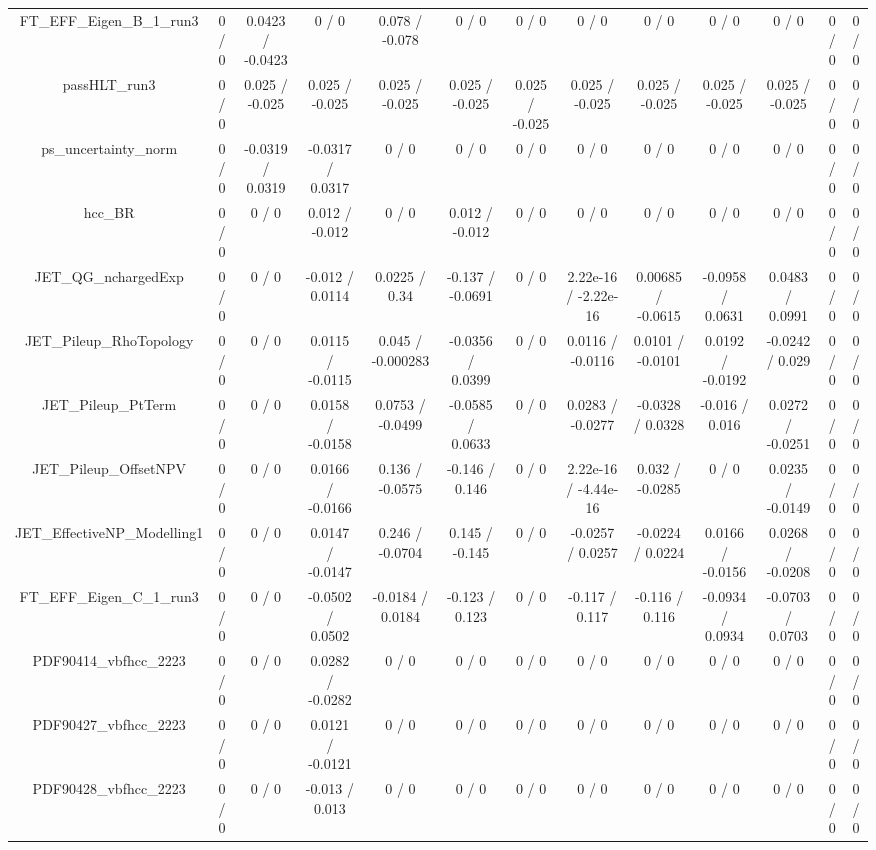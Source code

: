 \documentclass[10pt]{article}
\begin{document}
\begin{table}[htbp]
\begin{center}
\begin{tabular}{|c|c|c|c|c|c|c|c|c|c|c|c|c|}
  FT_EFF_Eigen_B_1_run3 & 0 / 0 & 0.0423 / -0.0423 & 0 / 0 & 0.078 / -0.078 & 0 / 0 & 0 / 0 & 0 / 0 & 0 / 0 & 0 / 0 & 0 / 0 & 0 / 0 & 0 / 0 \\ 
  passHLT_run3 & 0 / 0 & 0.025 / -0.025 & 0.025 / -0.025 & 0.025 / -0.025 & 0.025 / -0.025 & 0.025 / -0.025 & 0.025 / -0.025 & 0.025 / -0.025 & 0.025 / -0.025 & 0.025 / -0.025 & 0 / 0 & 0 / 0 \\ 
  ps_uncertainty_norm & 0 / 0 & -0.0319 / 0.0319 & -0.0317 / 0.0317 & 0 / 0 & 0 / 0 & 0 / 0 & 0 / 0 & 0 / 0 & 0 / 0 & 0 / 0 & 0 / 0 & 0 / 0 \\ 
  hcc_BR & 0 / 0 & 0 / 0 & 0.012 / -0.012 & 0 / 0 & 0.012 / -0.012 & 0 / 0 & 0 / 0 & 0 / 0 & 0 / 0 & 0 / 0 & 0 / 0 & 0 / 0 \\ 
  JET_QG_nchargedExp & 0 / 0 & 0 / 0 & -0.012 / 0.0114 & 0.0225 / 0.34 & -0.137 / -0.0691 & 0 / 0 & 2.22e-16 / -2.22e-16 & 0.00685 / -0.0615 & -0.0958 / 0.0631 & 0.0483 / 0.0991 & 0 / 0 & 0 / 0 \\ 
  JET_Pileup_RhoTopology & 0 / 0 & 0 / 0 & 0.0115 / -0.0115 & 0.045 / -0.000283 & -0.0356 / 0.0399 & 0 / 0 & 0.0116 / -0.0116 & 0.0101 / -0.0101 & 0.0192 / -0.0192 & -0.0242 / 0.029 & 0 / 0 & 0 / 0 \\ 
  JET_Pileup_PtTerm & 0 / 0 & 0 / 0 & 0.0158 / -0.0158 & 0.0753 / -0.0499 & -0.0585 / 0.0633 & 0 / 0 & 0.0283 / -0.0277 & -0.0328 / 0.0328 & -0.016 / 0.016 & 0.0272 / -0.0251 & 0 / 0 & 0 / 0 \\ 
  JET_Pileup_OffsetNPV & 0 / 0 & 0 / 0 & 0.0166 / -0.0166 & 0.136 / -0.0575 & -0.146 / 0.146 & 0 / 0 & 2.22e-16 / -4.44e-16 & 0.032 / -0.0285 & 0 / 0 & 0.0235 / -0.0149 & 0 / 0 & 0 / 0 \\ 
  JET_EffectiveNP_Modelling1 & 0 / 0 & 0 / 0 & 0.0147 / -0.0147 & 0.246 / -0.0704 & 0.145 / -0.145 & 0 / 0 & -0.0257 / 0.0257 & -0.0224 / 0.0224 & 0.0166 / -0.0156 & 0.0268 / -0.0208 & 0 / 0 & 0 / 0 \\ 
  FT_EFF_Eigen_C_1_run3 & 0 / 0 & 0 / 0 & -0.0502 / 0.0502 & -0.0184 / 0.0184 & -0.123 / 0.123 & 0 / 0 & -0.117 / 0.117 & -0.116 / 0.116 & -0.0934 / 0.0934 & -0.0703 / 0.0703 & 0 / 0 & 0 / 0 \\ 
  PDF90414_vbfhcc_2223 & 0 / 0 & 0 / 0 & 0.0282 / -0.0282 & 0 / 0 & 0 / 0 & 0 / 0 & 0 / 0 & 0 / 0 & 0 / 0 & 0 / 0 & 0 / 0 & 0 / 0 \\ 
  PDF90427_vbfhcc_2223 & 0 / 0 & 0 / 0 & 0.0121 / -0.0121 & 0 / 0 & 0 / 0 & 0 / 0 & 0 / 0 & 0 / 0 & 0 / 0 & 0 / 0 & 0 / 0 & 0 / 0 \\ 
  PDF90428_vbfhcc_2223 & 0 / 0 & 0 / 0 & -0.013 / 0.013 & 0 / 0 & 0 / 0 & 0 / 0 & 0 / 0 & 0 / 0 & 0 / 0 & 0 / 0 & 0 / 0 & 0 / 0 \\ 

\end{tabular}
\end{center}
\end{table}
\end{document}
